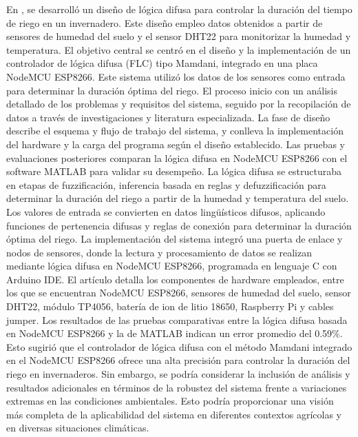 \bigbreak
En \cite{widyawati_fuzzy_2022}, se desarrolló un diseño de lógica difusa para controlar la duración del tiempo de riego en un invernadero. Este diseño empleo datos obtenidos a partir de sensores de humedad del suelo y el sensor DHT22 para monitorizar la humedad y temperatura. El objetivo central se centró en el diseño y la implementación de un controlador de lógica difusa (FLC) tipo Mamdani, integrado en una placa NodeMCU ESP8266. Este sistema utilizó los datos de los sensores como entrada para determinar la duración óptima del riego. El proceso inicio con un análisis detallado de los problemas y requisitos del sistema, seguido por la recopilación de datos a través de investigaciones y literatura especializada. La fase de diseño describe el esquema y flujo de trabajo del sistema, y conlleva la implementación del hardware y la carga del programa según el diseño establecido. Las pruebas y evaluaciones posteriores comparan la lógica difusa en NodeMCU ESP8266 con el software MATLAB para validar su desempeño. La lógica difusa se estructuraba en etapas de fuzzificación, inferencia basada en reglas y defuzzificación para determinar la duración del riego a partir de la humedad y temperatura del suelo. Los valores de entrada se convierten en datos lingüísticos difusos, aplicando funciones de pertenencia difusas y reglas de conexión para determinar la duración óptima del riego. La implementación del sistema integró una puerta de enlace y nodos de sensores, donde la lectura y procesamiento de datos se realizan mediante lógica difusa en NodeMCU ESP8266, programada en lenguaje C con Arduino IDE. El artículo detalla los componentes de hardware empleados, entre los que se encuentran NodeMCU ESP8266, sensores de humedad del suelo, sensor DHT22, módulo TP4056, batería de ion de litio 18650, Raspberry Pi y cables jumper. Los resultados de las pruebas comparativas entre la lógica difusa basada en NodeMCU ESP8266 y la de MATLAB indican un error promedio del 0.59\%. Esto sugirió que el controlador de lógica difusa con el método Mamdani integrado en el NodeMCU ESP8266 ofrece una alta precisión para controlar la duración del riego en invernaderos. Sin embargo, se podría considerar la inclusión de análisis y resultados adicionales en términos de la robustez del sistema frente a variaciones extremas en las condiciones ambientales. Esto podría proporcionar una visión más completa de la aplicabilidad del sistema en diferentes contextos agrícolas y en diversas situaciones climáticas.

